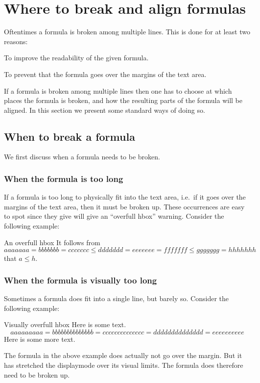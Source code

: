 \section{Where to break and align formulas}
\label{break and align ponts}

Oftentimes a formula is broken among multiple lines.
This is done for at least two reasons:
\begin{myitemize}
  \item
    To improve the readability of the given formula.
  \item
    To prevent that the formula goes over the margins of the text area.
\end{myitemize}
If a formula is broken among multiple lines then one has to choose at which places the formula is broken, and how the resulting parts of the formula will be aligned.
In this section we present some standard ways of doing so.



\subsection{When to break a formula}

We first discuss when a formula needs to be broken.

\subsubsection{When the formula is too long}

If a formula is too long to physically fit into the text area, i.e.\ if it goes over the margins of the text area, then it must be broken up.
These occurrences are easy to spot since they give will give an \enquote{overfull hbox} warning.
Consider the following example:
\begingroup
\begin{showlatex}[before lower = {\hfuzz = 40pt}, after lower = {\hfuzz = 0pt}]{An overfull hbox}
  It follows from
  \[
    aaaaaaa
    =
    bbbbbbb
    =
    ccccccc
    \leq
    ddddddd
    =
    eeeeeee
    =
    fffffff
    \leq
    ggggggg
    =
    hhhhhhh
  \]
  that $a \leq h$.
\end{showlatex}
\endgroup

\subsubsection{When the formula is visually too long}

Sometimes a formula does fit into a single line, but barely so.
Consider the following example:
\begin{showlatex}{Visually overfull hbox}
Here is some text.
\[
  aaaaaaaaa = bbbbbbbbbbbbbb = cccccccccccccc = dddddddddddddd = eeeeeeeeee
\]
Here is some more text.
\end{showlatex}
The formula in the above example does actually not go over the margin.
But it has stretched the displaymode over its visual limits.
The formula does therefore need to be broken up.


